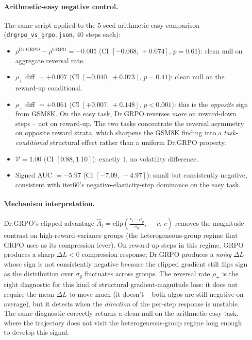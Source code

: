 \paragraph{Arithmetic-easy negative control.}
The same script applied to the 5-seed arithmetic-easy comparison
(\texttt{drgrpo\_vs\_grpo.json}, 40 steps each):
\begin{itemize}
\item $\rho^{\mathrm{Dr.GRPO}} - \rho^{\mathrm{GRPO}} = -0.005$
      (CI $[-0.068,\, +0.074]$, $p = 0.61$): clean null on aggregate
      reversal rate.
\item $\rho_{+}$ diff $= +0.007$ (CI $[-0.040,\, +0.073]$, $p = 0.41$):
      clean null on the reward-up conditional.
\item $\rho_{-}$ diff $= +0.061$ (CI $[+0.007,\, +0.148]$, $p < 0.001$):
      this is the \emph{opposite} sign from GSM8K. On the easy task,
      Dr.GRPO reverses \emph{more} on reward-down steps -- not on
      reward-up. The two tasks concentrate the reversal asymmetry on
      opposite reward strata, which sharpens the GSM8K finding into a
      \emph{task-conditional} structural effect rather than a uniform
      Dr.GRPO property.
\item $\mathcal{V} = 1.00$ (CI $[0.88, 1.10]$): exactly 1, no
      volatility difference.
\item Signed AUC $= -5.97$ (CI $[-7.09,\, -4.97]$): small but
      consistently negative, consistent with iter60's
      negative-elasticity-step dominance on the easy task.
\end{itemize}

\paragraph{Mechanism interpretation.}
Dr.GRPO's clipped advantage $\hat A_i = \mathrm{clip}\!\left(\frac{r_i -
\mu_g}{\sigma_g},\, -c,\, c\right)$ removes the magnitude contrast on
high-reward-variance groups (the heterogeneous-group regime that GRPO
uses as its compression lever). On reward-up steps in this regime,
GRPO produces a sharp $\Delta L < 0$ compression response; Dr.GRPO
produces a \emph{noisy} $\Delta L$ whose sign is not consistently
negative because the clipped gradient still flips sign as the
distribution over $\sigma_g$ fluctuates across groups. The reversal
rate $\rho_+$ is the right diagnostic for this kind of structural
gradient-magnitude loss: it does not require the mean $\Delta L$ to
move much (it doesn't -- both algos are still negative on average),
but it detects when the \emph{direction} of the per-step response is
unstable. The same diagnostic correctly returns a clean null on the
arithmetic-easy task, where the trajectory does not visit the
heterogeneous-group regime long enough to develop this signal.

